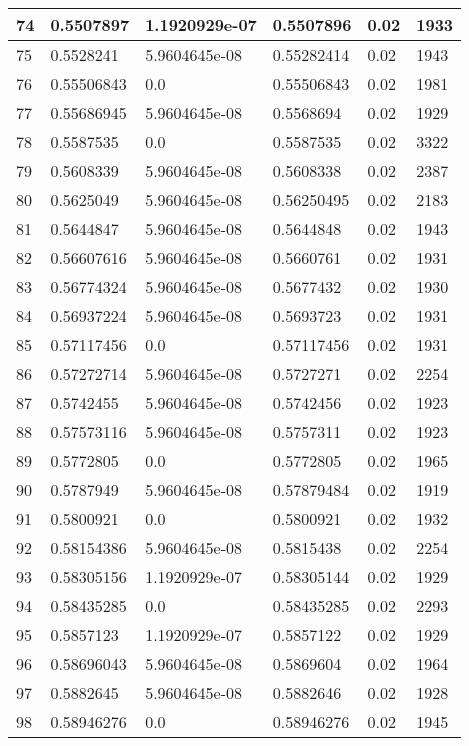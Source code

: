 \begin{longtable}{|l|l|l|l|l|l|}
74 & 0.5507897 & 1.1920929e-07 & 0.5507896 & 0.02 & 1933 \\ \hline 
75 & 0.5528241 & 5.9604645e-08 & 0.55282414 & 0.02 & 1943 \\ \hline 
76 & 0.55506843 & 0.0 & 0.55506843 & 0.02 & 1981 \\ \hline 
77 & 0.55686945 & 5.9604645e-08 & 0.5568694 & 0.02 & 1929 \\ \hline 
78 & 0.5587535 & 0.0 & 0.5587535 & 0.02 & 3322 \\ \hline 
79 & 0.5608339 & 5.9604645e-08 & 0.5608338 & 0.02 & 2387 \\ \hline 
80 & 0.5625049 & 5.9604645e-08 & 0.56250495 & 0.02 & 2183 \\ \hline 
81 & 0.5644847 & 5.9604645e-08 & 0.5644848 & 0.02 & 1943 \\ \hline 
82 & 0.56607616 & 5.9604645e-08 & 0.5660761 & 0.02 & 1931 \\ \hline 
83 & 0.56774324 & 5.9604645e-08 & 0.5677432 & 0.02 & 1930 \\ \hline 
84 & 0.56937224 & 5.9604645e-08 & 0.5693723 & 0.02 & 1931 \\ \hline 
85 & 0.57117456 & 0.0 & 0.57117456 & 0.02 & 1931 \\ \hline 
86 & 0.57272714 & 5.9604645e-08 & 0.5727271 & 0.02 & 2254 \\ \hline 
87 & 0.5742455 & 5.9604645e-08 & 0.5742456 & 0.02 & 1923 \\ \hline 
88 & 0.57573116 & 5.9604645e-08 & 0.5757311 & 0.02 & 1923 \\ \hline 
89 & 0.5772805 & 0.0 & 0.5772805 & 0.02 & 1965 \\ \hline 
90 & 0.5787949 & 5.9604645e-08 & 0.57879484 & 0.02 & 1919 \\ \hline 
91 & 0.5800921 & 0.0 & 0.5800921 & 0.02 & 1932 \\ \hline 
92 & 0.58154386 & 5.9604645e-08 & 0.5815438 & 0.02 & 2254 \\ \hline 
93 & 0.58305156 & 1.1920929e-07 & 0.58305144 & 0.02 & 1929 \\ \hline 
94 & 0.58435285 & 0.0 & 0.58435285 & 0.02 & 2293 \\ \hline 
95 & 0.5857123 & 1.1920929e-07 & 0.5857122 & 0.02 & 1929 \\ \hline 
96 & 0.58696043 & 5.9604645e-08 & 0.5869604 & 0.02 & 1964 \\ \hline 
97 & 0.5882645 & 5.9604645e-08 & 0.5882646 & 0.02 & 1928 \\ \hline 
98 & 0.58946276 & 0.0 & 0.58946276 & 0.02 & 1945 \\ \hline 

\end{longtable}
